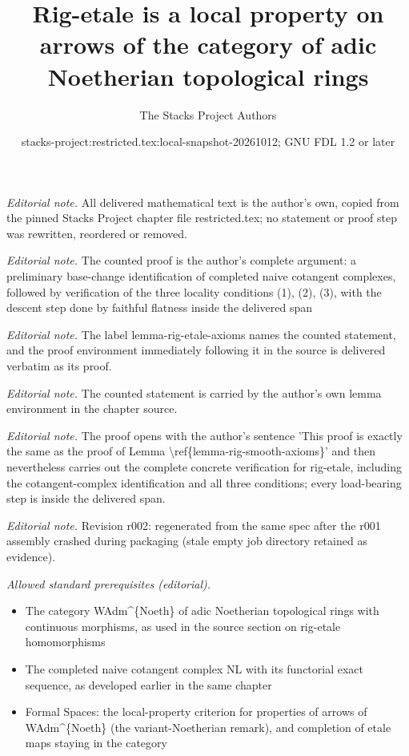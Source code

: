 \documentclass[10pt,a4paper]{amsart}
\title{Rig-etale is a local property on arrows of the category of adic Noetherian topological rings}
\author{The Stacks Project Authors}
\date{stacks-project:restricted.tex:local-snapshot-20261012; GNU FDL 1.2 or later}
\theoremstyle{plain}
\theoremstyle{definition}
\theoremstyle{remark}
\numberwithin{equation}{subsection}
\begin{document}
\maketitle
\noindent\textit{Editorial note.} All delivered mathematical text is the author's own, copied from the pinned Stacks Project chapter file restricted.tex; no statement or proof step was rewritten, reordered or removed.\par\medskip
\noindent\textit{Editorial note.} The counted proof is the author's complete argument: a preliminary base-change identification of completed naive cotangent complexes, followed by verification of the three locality conditions (1), (2), (3), with the descent step done by faithful flatness inside the delivered span\par\medskip
\noindent\textit{Editorial note.} The label lemma-rig-etale-axioms names the counted statement, and the proof environment immediately following it in the source is delivered verbatim as its proof.\par\medskip
\noindent\textit{Editorial note.} The counted statement is carried by the author's own lemma environment in the chapter source.\par\medskip
\noindent\textit{Editorial note.} The proof opens with the author's sentence 'This proof is exactly the same as the proof of Lemma \textbackslash{}ref\{lemma-rig-smooth-axioms\}' and then nevertheless carries out the complete concrete verification for rig-etale, including the cotangent-complex identification and all three conditions; every load-bearing step is inside the delivered span.\par\medskip
\noindent\textit{Editorial note.} Revision r002: regenerated from the same spec after the r001 assembly crashed during packaging (stale empty job directory retained as evidence).\par\medskip
\noindent\textit{Allowed standard prerequisites (editorial).}\begin{itemize}
\item The category WAdm\textasciicircum{}\{Noeth\} of adic Noetherian topological rings with continuous morphisms, as used in the source section on rig-etale homomorphisms
\item The completed naive cotangent complex NL with its functorial exact sequence, as developed earlier in the same chapter
\item Formal Spaces: the local-property criterion for properties of arrows of WAdm\textasciicircum{}\{Noeth\} (the variant-Noetherian remark), and completion of etale maps staying in the category
\end{itemize}\medskip
\end{document}
